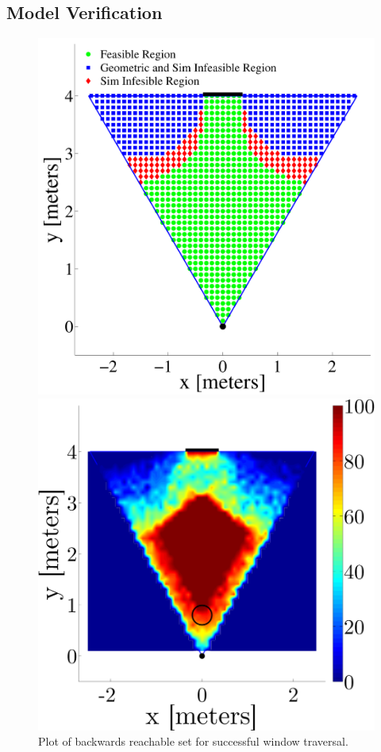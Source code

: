 \documentclass{aamas2013}
\begin{document}
\subsection{Model Verification}

\begin{figure}[tb]
\begin{minipage}[b]{0.45\linewidth}
\includegraphics[width=\textwidth]{figures/feasible_set.pdf}
\caption{Plot of backwards reachable set for successful window traversal.}
\label{fig:feasible_set}
\end{minipage}
\hfill
\begin{minipage}[b]{0.45\linewidth}
\centering
\centering
\includegraphics[width=\textwidth]{figures/heat_map.png}

\end{minipage}
\end{figure}
\end{document}
